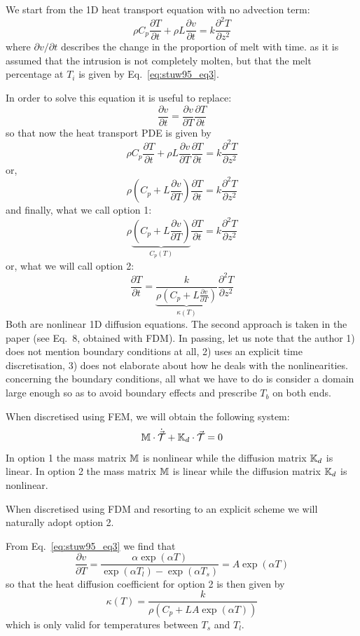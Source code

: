 We start from the 1D heat transport equation with no advection term:
\[
\rho C_p \frac{\partial T}{\partial t} + \rho L \frac{\partial v}{\partial t} 
= k  \frac{\partial^2 T}{\partial z^2} 
\]
where $\partial v/ \partial t$ describes the change in the proportion of melt with time.
as it is assumed that the intrusion is not completely molten, but that the
melt percentage at $T_i$ is given by Eq.~\eqref{eq:stuw95_eq3}.

In order to solve this equation it is useful to replace:
\[
\frac{\partial v}{\partial t} = \frac{\partial v}{\partial T}\frac{\partial T}{\partial t}
\]
so that now the heat transport PDE is given by
\[
\rho C_p \frac{\partial T}{\partial t} + \rho L 
\frac{\partial v}{\partial T}\frac{\partial T}{\partial t}
= k  \frac{\partial^2 T}{\partial z^2} 
\]
or,
\[
\rho \left(C_p + L \frac{\partial v}{\partial T} \right)
\frac{\partial T}{\partial t} = k  \frac{\partial^2 T}{\partial z^2} 
\]
and finally, what we call option 1:
\[
\boxed{
\rho \underbrace{\left(C_p + L \frac{\partial v}{\partial T} \right)}_{C_p(T)}
\frac{\partial T}{\partial t} = k  \frac{\partial^2 T}{\partial z^2} 
}
\]
or, what we will call option 2:
\[
\boxed{
\frac{\partial T}{\partial t} = 
\underbrace{\frac{k}{\rho \left(C_p + L \frac{\partial v}{\partial T} \right)}}_{\kappa(T)} \frac{\partial^2 T}{\partial z^2} 
}
\]
Both are nonlinear 1D diffusion equations.  The second approach 
is taken in the paper (see Eq.~8, obtained with FDM).
In passing, let us note that the author 
1) does not mention boundary conditions at all,
2) uses an explicit time discretisation,
3) does not elaborate about how he deals with the nonlinearities.    
concerning the boundary conditions, all what we have to do is 
consider a domain large enough so 
as to avoid boundary effects and prescribe $T_b$ on both ends.

When discretised using FEM, we will obtain the following system:
\[
{\mathbb{M}} \cdot \dot{\vec{{\cal T}}} + {\mathbb{K}}_d \cdot \vec{\cal T} = 0
\]
In option 1 the mass matrix ${\mathbb{M}}$ is nonlinear while the diffusion matrix ${\mathbb{K}}_d$ is linear.
In option 2 the mass matrix ${\mathbb{M}}$ is linear while the diffusion matrix ${\mathbb{K}}_d$ is nonlinear.

When discretised using FDM and resorting to an explicit scheme we will
naturally adopt option 2.

From Eq.~\eqref{eq:stuw95_eq3} we find that
\[
\frac{\partial v}{\partial T}  
= \frac{\alpha \exp (\alpha T) }{\exp(\alpha T_l) - \exp(\alpha T_s) } 
=A \exp (\alpha T)
\]
so that the heat diffusion coefficient for option 2 is then given by
\[
\kappa(T) = \frac{k}{\rho \left(C_p + L A \exp(\alpha T) \right)}
\]
which is only valid for temperatures between $T_s$ and $T_l$.


